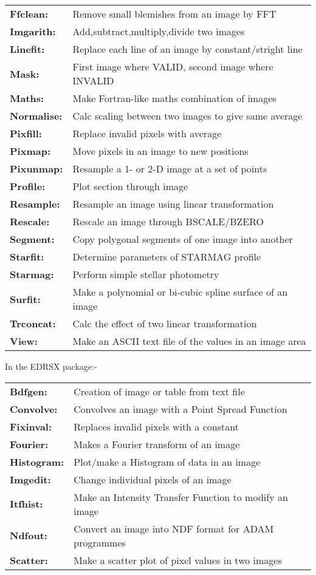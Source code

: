\begin{tabular}{ll}
{\bf  Ffclean:} &       Remove small blemishes from an image by FFT \\
{\bf  Imgarith:} &      Add,subtract,multiply,divide two images \\
{\bf  Linefit:} &       Replace each line of an image by constant/stright line \\
{\bf  Mask:} &          First image where VALID, second image where INVALID \\
{\bf  Maths:} &         Make Fortran-like maths combination of images \\
{\bf  Normalise:} &     Calc scaling between two images to give same average \\
{\bf  Pixfill:} &       Replace invalid pixels with average \\
{\bf  Pixmap:} &        Move pixels in an image to new positions \\
{\bf  Pixunmap:} &      Resample a 1- or 2-D image at a set of points \\
{\bf  Profile:} &       Plot section through image \\
{\bf  Resample:} &      Resample an image using linear transformation \\
{\bf  Rescale:} &       Rescale an image through BSCALE/BZERO \\
{\bf  Segment:} &       Copy polygonal segments of one image into another \\
{\bf  Starfit:} &       Determine parameters of STARMAG profile \\
{\bf  Starmag:} &       Perform simple stellar photometry \\
{\bf  Surfit:} &        Make a polynomial or bi-cubic spline surface of an image \\
{\bf  Trconcat:} &      Calc the effect of two linear transformation \\
{\bf  View:} &          Make an ASCII text file of the values in an image area \\
\end{tabular}


 In the EDRSX package:-

\begin{tabular}{ll}
{\bf  Bdfgen:} &      Creation of image or table from text file \\
{\bf  Convolve:} &    Convolves an image with a Point Spread Function \\
{\bf  Fixinval:} &    Replaces invalid pixels with a constant   \\
{\bf  Fourier:} &     Makes a Fourier transform of an image  \\
{\bf  Histogram:} &   Plot/make a Histogram of data in an image    \\
{\bf  Imgedit:} &     Change individual pixels of an image  \\
{\bf  Itfhist:} &     Make an Intensity Transfer Function to modify an image  \\
{\bf  Ndfout:} &      Convert an image into NDF format for  ADAM programmes \\
{\bf  Scatter:} &     Make a scatter plot of pixel values in two images \\
\end{tabular}
   

